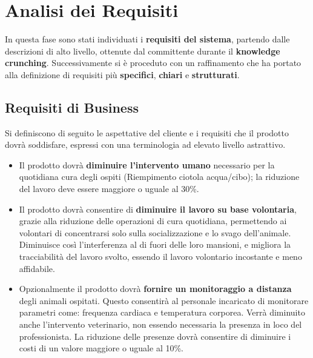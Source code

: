 
\chapter{Analisi dei Requisiti}
In questa fase sono stati individuati i \textbf{requisiti del sistema}, partendo dalle descrizioni di alto livello, ottenute dal committente durante il \textbf{knowledge crunching}. Successivamente si è proceduto con un raffinamento che ha portato alla definizione di requisiti più \textbf{specifici}, \textbf{chiari} e \textbf{strutturati}.
	\section{Requisiti di Business}
	Si definiscono di seguito le aspettative del cliente e i requisiti che il prodotto dovrà soddisfare, espressi con una terminologia ad elevato livello astrattivo.
        \begin{itemize}
            \item Il prodotto dovrà \textbf{diminuire l'intervento umano} necessario per la quotidiana cura degli ospiti (Riempimento ciotola acqua/cibo); la riduzione del lavoro deve essere maggiore o uguale al 30\%.
            \item Il prodotto dovrà consentire di \textbf{diminuire il lavoro su base volontaria}, grazie alla riduzione delle operazioni di cura quotidiana, permettendo ai volontari di concentrarsi solo sulla socializzazione e lo svago dell'animale.
            Diminuisce così l'interferenza al di fuori delle loro mansioni, e migliora la tracciabilità del lavoro svolto, essendo il lavoro volontario incostante e meno affidabile.
            \item Opzionalmente il prodotto dovrà \textbf{fornire un monitoraggio a distanza} degli animali ospitati.
            Questo consentirà al personale incaricato di monitorare parametri come: frequenza cardiaca e temperatura corporea. Verrà diminuito anche l'intervento veterinario, non essendo necessaria la presenza in loco del professionista. La riduzione delle presenze dovrà consentire di diminuire i costi di un valore maggiore o uguale al 10\%.
        \end{itemize}
	
